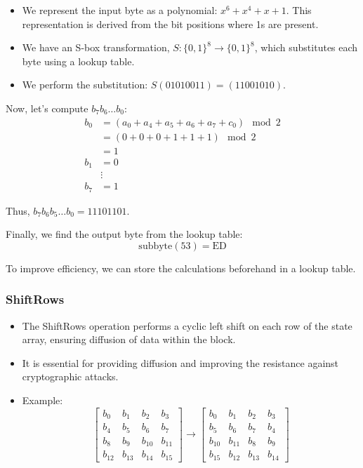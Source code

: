 \documentclass[11pt]{article}
\begin{document}
\begin{itemize}
    \item We represent the input byte as a polynomial: \( x^6 + x^4 + x + 1 \). This representation is derived from the bit positions where 1s are present.
    \item We have an S-box transformation, \( S: \{0,1\}^8 \rightarrow \{0,1\}^8 \), which substitutes each byte using a lookup table.
    \item We perform the substitution: \( S(01010011) = (11001010) \).
\end{itemize}

Now, let's compute \( b_7b_6 \ldots b_0 \):
\begin{align*}
    b_0 &= (a_0 + a_4 + a_5 + a_6 + a_7 + c_0) \mod 2 \\
    &= (0 + 0 + 0 + 1 + 1 + 1) \mod 2 \\
    &= 1 \\
    b_1 &= 0 \\
    &\vdots \\
    b_7 &= 1
\end{align*}

Thus, \( b_7b_6b_5 \ldots b_0 = 11101101 \).

Finally, we find the output byte from the lookup table:
\[ \text{subbyte}(53) = \text{ED} \]

To improve efficiency, we can store the calculations beforehand in a lookup table.



\subsubsection*{ShiftRows}
\begin{itemize}
    \item The ShiftRows operation performs a cyclic left shift on each row of the state array, ensuring diffusion of data within the block.
    \item It is essential for providing diffusion and improving the resistance against cryptographic attacks.
    \item Example:
    \[
    \begin{bmatrix}
    b_0 & b_1 & b_2 & b_3 \\
    b_4 & b_5 & b_6 & b_7 \\
    b_8 & b_9 & b_{10} & b_{11} \\
    b_{12} & b_{13} & b_{14} & b_{15}
    \end{bmatrix}
    \rightarrow
    \begin{bmatrix}
    b_0 & b_1 & b_2 & b_3 \\
    b_5 & b_6 & b_7 & b_4 \\
    b_{10} & b_{11} & b_8 & b_9 \\
    b_{15} & b_{12} & b_{13} & b_{14}
    \end{bmatrix}
    \]
\end{itemize}
\end{document}
